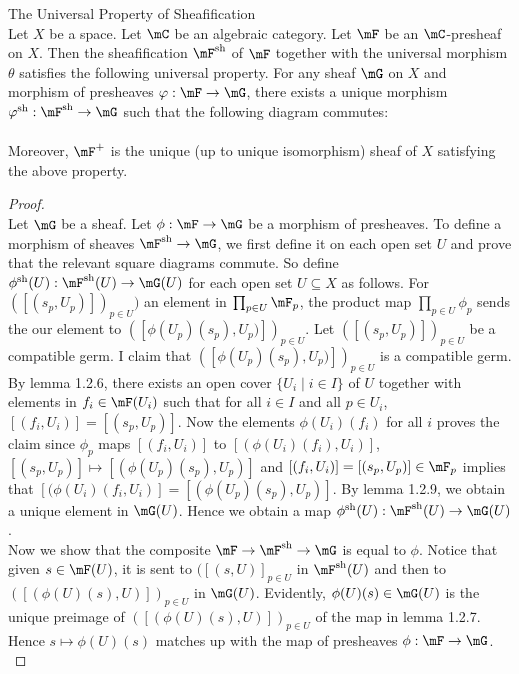 \documentclass[a4paper]{article}
\begin{document}
\begin{prp}{The Universal Property of Sheafification}{}\\
Let $X$ be a space. Let $\mC$ be an algebraic category. Let $\mF$ be an $\mC$-presheaf on $X$. Then the sheafification $\mF^\text{sh}$ of $\mF$ together with the universal morphism $\theta$ satisfies the following universal property. For any sheaf $\mG$ on $X$ and morphism of presheaves $\varphi:\mF\to\mG$, there exists a unique morphism $\varphi^\text{sh}:\mF^\text{sh}\to\mG$ such that the following diagram commutes: \\
 \\
Moreover, $\mF^+$ is the unique (up to unique isomorphism) sheaf of $X$ satisfying the above property. 
\begin{proof}\\
Let $\mG$ be a sheaf. Let $\phi:\mF\to\mG$ be a morphism of presheaves. To define a morphism of sheaves $\mF^\text{sh}\to\mG$, we first define it on each open set $U$ and prove that the relevant square diagrams commute. So define $\phi^\text{sh}(U):\mF^\text{sh}(U)\to\mG(U)$ for each open set $U\subseteq X$ as follows. For $([(s_p,U_p)])_{p\in U})$ an element in $\prod_{p\in U}\mF_p$, the product map $\prod_{p\in U}\phi_p$ sends the our element to $([\phi(U_p)(s_p),U_p)])_{p\in U}$. Let $([(s_p,U_p)])_{p\in U}$ be a compatible germ. I claim that $([\phi(U_p)(s_p),U_p)])_{p\in U}$ is a compatible germ. By lemma 1.2.6, there exists an open cover $\{U_i\;|\;i\in I\}$ of $U$ together with elements in $f_i\in\mF(U_i)$ such that for all $i\in I$ and all $p\in U_i$, $[(f_i,U_i)]=[(s_p,U_p)]$. Now the elements $\phi(U_i)(f_i)$ for all $i$ proves the claim since $\phi_p$ maps $[(f_i,U_i)]$ to $[(\phi(U_i)(f_i),U_i)]$, $[(s_p,U_p)]\mapsto[(\phi(U_p)(s_p),U_p)]$ and $[(f_i,U_i)]=[(s_p,U_p)]\in\mF_p$ implies that $[(\phi(U_i)(f_i,U_i)]=[(\phi(U_p)(s_p),U_p)]$. By lemma 1.2.9, we obtain a unique element in $\mG(U)$. Hence we obtain a map $\phi^\text{sh}(U):\mF^\text{sh}(U)\to\mG(U)$. \\

Now we show that the composite $\mF\to\mF^\text{sh}\to\mG$ is equal to $\phi$. Notice that given $s\in\mF(U)$, it is sent to $([(s,U)]_{p\in U}$ in $\mF^\text{sh}(U)$ and then to $([(\phi(U)(s),U)])_{p\in U}$ in $\mG(U)$. Evidently, $\phi(U)(s)\in\mG(U)$ is the unique preimage of $([(\phi(U)(s),U)])_{p\in U}$ of the map in lemma 1.2.7. Hence $s\mapsto\phi(U)(s)$ matches up with the map of presheaves $\phi:\mF\to\mG$. \\


\end{proof}
\end{prp}
\end{document}
